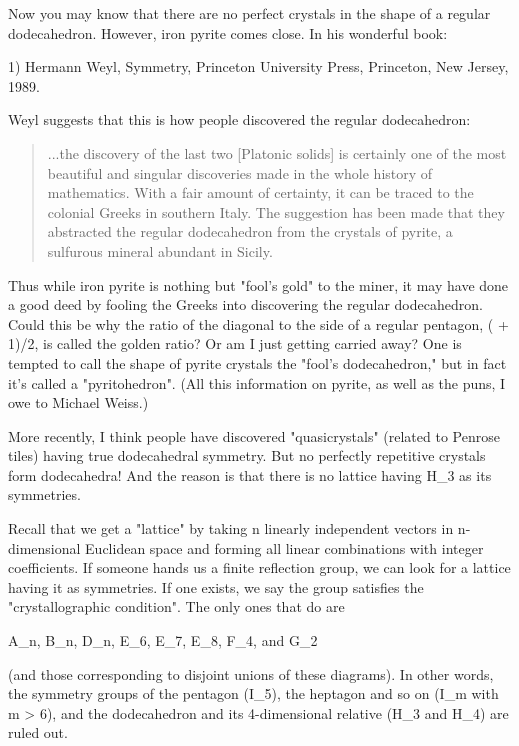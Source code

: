 Now you may know that there are no perfect crystals in the shape of a
regular dodecahedron.  However, iron pyrite comes close.  In his wonderful
book:

1) Hermann Weyl, Symmetry, Princeton University Press, Princeton, New
Jersey, 1989.

Weyl suggests that this is how people discovered the regular dodecahedron:

\begin{quote}
    ...the discovery of the last two [Platonic solids] is certainly
    one of the most beautiful and singular discoveries made in the
    whole history of mathematics.  With a fair amount of certainty, it
    can be traced to the colonial Greeks in southern Italy.  The
    suggestion has been made that they abstracted the regular
    dodecahedron from the crystals of pyrite, a sulfurous mineral
    abundant in Sicily.
\end{quote}
    

Thus while iron pyrite is nothing but "fool's gold" to the miner, it
may have done a good deed by fooling the Greeks into discovering the
regular dodecahedron.  Could this be why the ratio of the diagonal
to the side of a regular pentagon, ( + 1)/2, is called the golden
ratio?  Or am I just getting carried away?  One is tempted to call the
shape of pyrite crystals the "fool's dodecahedron," but in fact it's
called a "pyritohedron".  (All this information on pyrite, as well as
the puns, I owe to Michael Weiss.)

More recently, I think people have discovered "quasicrystals" (related to
Penrose tiles) having true dodecahedral symmetry.  But no perfectly
repetitive crystals form dodecahedra!  And the reason is that there is no
lattice having H_{3} as its symmetries.

Recall that we get a "lattice" by taking n linearly independent vectors
in n-dimensional Euclidean space and forming all linear combinations
with integer coefficients.  If someone hands us a finite reflection group,
we can look for a lattice having it as symmetries.  If one exists, 
we say the group satisfies the "crystallographic condition".  The only
ones that do are

A_{n}, B_{n}, D_{n}, E_{6}, E_{7}, 
E_{8}, F_{4}, and G_{2}

(and those corresponding to disjoint unions of these diagrams).
In other words, the symmetry groups of the pentagon (I_{5}), the
heptagon and so on (I_{m} with m > 6), and the dodecahedron and its
4-dimensional relative (H_{3} and H_{4}) are ruled out.  

